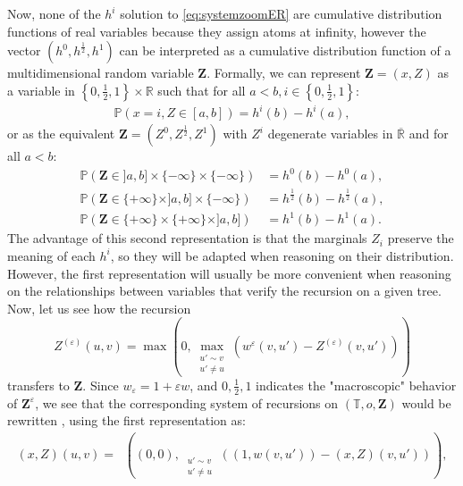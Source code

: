 \documentclass[11pt]{article}
\DeclareMathOperator{\lex}{lex}
\DeclareMathOperator*{\maxlex}{\overset{\lex}{\max}}
\newcommand{\eps}{\varepsilon}
\begin{document}
Now, none of the $h^i$ solution to \eqref{eq:systemzoomER} are cumulative distribution functions of real variables because they assign atoms at infinity, however the vector $(h^0,h^{\frac{1}{2}},h^1)$ can be interpreted as a cumulative distribution function of a multidimensional random variable $\mathbf{Z}$.
Formally, we can represent $\mathbf{Z}=(x,Z)$ as a variable in $\left\{ 0, \frac{1}{2}, 1 \right\} \times \mathbb{R}$ such that for all $a<b, i \in \left\{0, \frac{1}{2},1\right\}$:
\begin{align*}
    \mathbb{P}( x= i , Z \in [a,b])=h^i(b)-h^i(a),
\end{align*}
or as the equivalent $\mathbf{Z}=(Z^0,Z^{\frac{1}{2}},Z^1)$ with $Z^i$ degenerate variables in $\overline{\mathbb{R}}$ and for all $a<b$:
\begin{align*}
    \mathbb{P}( \mathbf{Z} \in ]a,b] \times \{ -\infty \} \times \{ -\infty \} )&= h^0(b)-h^0(a), \\
    \mathbb{P}( \mathbf{Z} \in \{ + \infty \} \times ]a,b] \times \{ -\infty \} )&= h^{\frac{1}{2}}(b)-h^{\frac{1}{2}}(a), \\
    \mathbb{P}( \mathbf{Z} \in \{ +\infty \} \times \{ +\infty \} \times ]a,b] )&= h^1(b)-h^1(a).
\end{align*}
The advantage of this second representation is that the marginals $Z_i$ preserve the meaning of each $h^i$, so they will be adapted when reasoning on their distribution. However, the first representation will usually be more convenient when reasoning on the relationships between variables that verify the recursion on a given tree.
Now, let us see how the recursion
\begin{equation}
    Z^{(\eps)}(u,v)= \max(0,\max_{\substack{ u' \sim v \\ u' \neq u}}\left( w^\eps(v,u')-Z^{(\eps)}(v,u') \right) )
\end{equation}
transfers to $\mathbf{Z}$. Since $w_\eps=1+\eps w$, and $0,\frac{1}{2},1$ indicates the "macroscopic" behavior of $\mathbf{Z}^\varepsilon$, we see that the corresponding system of recursions on $(\mathbb{T},o, \mathbf{Z})$ would be rewritten , using the first representation as:
\begin{equation}\label{eq:recursion(x,Z)}
    \begin{aligned}
        (x,Z)(u,v)=\maxlex\left( (0,0) , \maxlex_{\substack{ u' \sim v \\ u' \neq u}}\left( (1,w(v,u'))-(x,Z)(v,u') \right) \right)  ,
    \end{aligned}
\end{equation}
\end{document}
